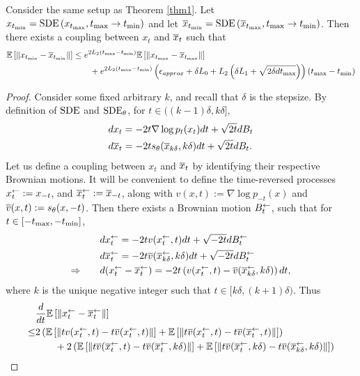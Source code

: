 \begin{lemma}
    \label{l:discretization_sde}
    Consider the same setup as Theorem \ref{thm1}. Let $x_{t_{\textrm{min}}} = \textrm{SDE}\left( x_{t_{\textrm{max}}}, t_{\textrm{max}} \to t_{\textrm{min}} \right)$ and let $\overline{x}_{t_{\textrm{min}}} = \textrm{SDE}\left( \overline{x}_{t_{\textrm{max}}}, t_{\textrm{max}} \to t_{\textrm{min}} \right)$. Then there exists a coupling between $x_t$ and $\overline{x}_t$ such that
    \begin{align*}
        \mathbb{E}\left[ {\left\| x_{t_{\textrm{min}}}- \overline{x}_{t_{\textrm{min}}} \right\|} \right] 
        &\leq e^{2L_2 \left( t_{\textrm{max}} - t_{\textrm{min}} \right)} \mathbb{E}\left[ {\left\| x_{t_{\textrm{max}}}- \overline{x}_{t_{\textrm{max}}} \right\|} \right]\\
        &\hspace{20pt}+ e^{2L_2 \left( t_{\textrm{max}} - t_{\textrm{min}} \right)}\left( {\epsilon_{approx}} + \delta L_0 + L_2 \left( \delta L_1 + \sqrt{2\delta d t_{\textrm{max}}} \right) \right)\left( t_{\textrm{max}} - t_{\textrm{min}} \right)
    \end{align*}
\end{lemma}
\begin{proof}
    Consider some fixed arbitrary $k$, and recall that $\delta$ is the stepsize. By definition of $\textrm{SDE}$ and ${\textrm{SDE}_\theta}$, for $t\in((k-1)\delta, k\delta]$,
    \begin{align*}
        & d x_t = - 2 t \nabla \log p_t(x_t) dt + \sqrt{2t} dB_t\\
        & d \overline{x}_t = - 2 t s_{\theta}(\overline{x}_{k\delta}, k\delta) dt + \sqrt{2t} dB_t.
    \end{align*}
    Let us define a coupling between $x_t$ and $\overline{x}_t$ by identifying their respective Brownian motions. It will be convenient to define the time-reversed processes $x^{\leftarrow}_t := x_{-t}$, and $\overline{x}^{\leftarrow}_t := \overline{x}_{-t}$, along with $v(x,t):= \nabla \log p_{-t}(x)$ and $\overline{v}(x,t) := s_{\theta}(x,-t)$. Then there exists a Brownian motion $B^{\leftarrow}_t$, such that for $t\in[-t_{\textrm{max}}, -t_{\textrm{min}}]$,
    \begin{align*}
        & d x^{\leftarrow}_t =  - 2 t v(x^{\leftarrow}_t,t) dt + \sqrt{-2t} dB^{\leftarrow}_t\\
        & d \overline{x}^{\leftarrow}_t =  - 2 t \overline{v}(\overline{x}^{\leftarrow}_{k\delta},k\delta) dt + \sqrt{-2t} dB^{\leftarrow}_t\\
        \Rightarrow \qquad 
        & d (x^{\leftarrow}_t - \overline{x}^{\leftarrow}_t) = - 2 t\left(  v(x^{\leftarrow}_t,t) - \overline{v}(\overline{x}^{\leftarrow}_{k\delta},k\delta) \right)dt,
    \end{align*}
    where $k$ is the unique negative integer such that $t \in [k\delta, (k+1)\delta)$. Thus
    \begin{align*}
        & \frac{d}{dt} \E{\lrn{\xr_{t}- \bxr_{t}}}\\
        \leq& 2 \lrp{\E{\lrn{t v(\xr_t,t) - t\bv(\xr_t,t) }}+ \E{\lrn{t \bv(\xr_t,t) - t \bv(\bxr_t, t)}}} \\
        &\qquad + 2\lrp{\E{\lrn{t \bv(\bxr_t, t) - t \bv(\bxr_t, k\delta)}}+ \E{\lrn{t \bv(\bxr_t, k\delta) - t \bv(\bxr_{k\delta}, k\delta)}}} \\

\end{align*}
\end{proof}
